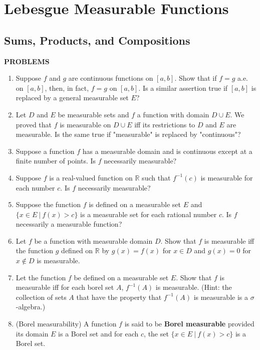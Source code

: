 \chapter{Lebesgue Measurable Functions}

\section{Sums, Products, and Compositions}
\begin{center}
	\textbf{PROBLEMS}
\end{center}
\begin{enumerate}
	\setcounter{enumi}{0}
	\item Suppose $f$ and $g$ are continuous functions on $[a,b]$. Show that if $f=g$ a.e. on $[a,b]$, then, in fact, $f=g$ on $[a,b]$.
    Is a similar assertion true if $[a,b]$ is replaced by a general measurable set $E$?
    \item Let $D$ and $E$ be measurable sets and $f$ a function with domain $D\cup E$. We proved that $f$ is measurable on $D\cup E$ iff its restrictions to $D$ and $E$ are measurable.
    Is the same true if "measurable" is replaced by "continuous"?
    \item Suppose a function $f$ has a measurable domain and is continuous except at a finite number of points.
    Is $f$ necessarily measurable?
    \item Suppose $f$ is a real-valued function on $\mathbb{R}$ such that $f^{-1}(c)$ is measurable for each number $c$. Is $f$ necessarily measurable?
    \item Suppose the function $f$ is defined on a measurable set $E$ and $\{x\in E\ |\ f(x)>c\}$ is a measurable set for each rational number $c$. Is $f$ necessarily a measurable function?
    \item Let $f$ be a function with measurable domain $D$. Show that $f$ is measurable iff the function $g$ defined on $\mathbb{R}$ by $g(x)=f(x)$ for $x\in D$ and $g(x)=0$ for $x\notin D$ is measurable.
    \item Let the function $f$ be defined on a measurable set $E$. Show that $f$ is measurable iff for each borel set $A$, $f^{-1}(A)$ is measurable. (Hint: the collection of sets $A$ that have the property that $f^{-1}(A)$ is measurable is a $\sigma$-algebra.)
    \item (Borel measurability) A function $f$ is said to be \textbf{Borel measurable} provided its domain $E$ is a Borel set and for each $c$, the set $\{x\in E\ |\ f(x)>c\}$ is a Borel set.

\end{enumerate}
